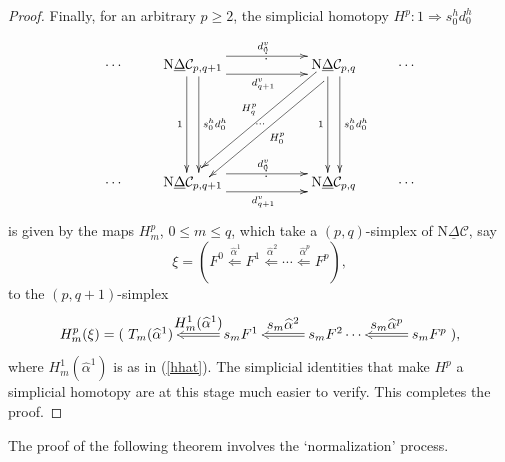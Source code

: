 \documentclass[]{amsart}
\begin{document}
\begin{proof}
Finally, for an arbitrary $p\geq 2$, the simplicial homotopy $H^p:1\Rightarrow s_0^hd_0^h$
$$ \xymatrix{\cdots & {\ensuremath{\mathrm{N}}}{\ensuremath{\underline{\Delta}}}{\ensuremath{\mathcal{C}}}_{p,q+1} \ar@<1.5ex>[rr]^{d_0^v} \ar@<-1.5ex>[rr]_{d_{q+1}^v}
\ar@<1ex>[dd]^{s_0^hd_0^h} \ar@<-1ex>[dd]_{1} & {}^{^{\vdots}} &
{\ensuremath{\mathrm{N}}}{\ensuremath{\underline{\Delta}}}{\ensuremath{\mathcal{C}}}_{p,q}\ar@<1ex>[dd]^{s_0^hd_0^h} \ar@<-1ex>[dd]_{1}
\ar@<1ex>[ddll]^{H_0^p}_{\ \ \dots}\ar@<-1ex>[ddll]_{H_q^p} & \cdots \\
&&&&\\
\cdots & {\ensuremath{\mathrm{N}}}{\ensuremath{\underline{\Delta}}}{\ensuremath{\mathcal{C}}}_{p,q+1} \ar@<1.5ex>[rr]^{d_0^v} \ar@<-1.5ex>[rr]_{d_{q+1}^v}
&{}^{^{\vdots}}&{\ensuremath{\mathrm{N}}} {\ensuremath{\underline{\Delta}}}{\ensuremath{\mathcal{C}}}_{p,q} &
\cdots\\
}
$$
is given by the maps $H_m^p$, $0\leq m\leq q$, which take a $(p,q)$-simplex of ${\ensuremath{\mathrm{N}}}{\ensuremath{\underline{\Delta}}}{\ensuremath{\mathcal{C}}}$, say
$$\xi=(F^0\overset{\ \textstyle \widehat{\alpha}^1}\Longleftarrow F^1 \overset{\ \textstyle \widehat{\alpha}^2}\Longleftarrow \cdots \overset{\ \textstyle \widehat{\alpha}^p}\Longleftarrow F^p),$$
to the $(p,q+1)$-simplex
$$
H^p_m(\xi)=(\xymatrix@C=30pt{T_m(\widehat{\alpha}^1)&\ar@{=>}[l]_-{\textstyle
H^1_m(\widehat{\alpha}^1)} s_mF^1&\ar@{=>}[l]_-{\textstyle
s_m\widehat{\alpha}^2}s_mF^2\cdots&\ar@{=>}[l]_-{ \textstyle s_m\widehat{\alpha}^p}s_mF^p}),$$
where $H_m^1(\widehat{\alpha}^1)$ is as in (\ref{hhat}). The simplicial identities that make $H^p$
a simplicial homotopy are at this stage much easier to verify. This completes the proof.
\end{proof}

The proof of the following theorem involves the `normalization' process.
\end{document}
